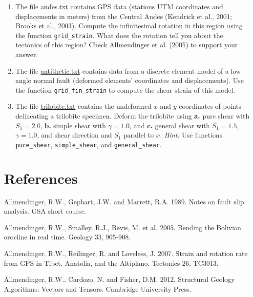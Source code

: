 \documentclass[a4paper , 12pt]{book}
\newcommand{\code}[1]{\colorbox{light-gray}{\texttt{#1}}}
\begin{document}
\begin{enumerate}
    \item The file \href{https://github.com/nfcd/compGeo/blob/master/source/data/ch8-exercise2/andes.txt}{andes.txt} contains GPS data (stations UTM coordinates and displacements in meters) from the Central Andes (Kendrick et al., 2001; Brooks et al., 2003). Compute the infinitesimal rotation in this region using the function \code{grid\_strain}. What does the rotation tell you about the tectonics of this region? Check Allmendinger et al. (2005) to support your answer.
    
    \item The file \href{https://github.com/nfcd/compGeo/blob/master/source/data/ch8-exercise3/antithetic.txt}{antithetic.txt} contains data from a discrete element model of a low angle normal fault (deformed elements' coordinates and displacements). Use the function \code{grid\_fin\_strain} to compute the shear strain of this model.
    
    \item The file \href{https://github.com/nfcd/compGeo/blob/master/source/data/ch8-exercise4/trilobite.txt}{trilobite.txt} contains the undeformed $x$ and $y$ coordinates of points delineating a trilobite specimen. Deform the trilobite using \textbf{a.}  pure shear with $S_1 = 2.0$, \textbf{b.} simple shear with $\gamma = 1.0$, and \textbf{c.} general shear with $S_1 = 1.5$, $\gamma = 1.0$, and shear direction and $S_1$ parallel to $x$. \textit{Hint:} Use functions \code{pure\_shear}, \code{simple\_shear}, and \code{general\_shear}.

\end{enumerate}

\section*{References}

Allmendinger, R.W., Gephart, J.W. and Marrett, R.A. 1989. Notes on fault slip analysis. GSA short course.

Allmendinger, R.W., Smalley, R.J., Bevis, M. et al. 2005. Bending the Bolivian orocline in real time. Geology 33, 905-908.

Allmendinger, R.W., Reilinger, R. and Loveless, J. 2007. Strain and rotation rate from GPS in Tibet, Anatolia, and the Altiplano. Tectonics 26, TC3013.

Allmendinger, R.W., Cardozo, N. and Fisher, D.M. 2012. Structural Geology Algorithms: Vectors and Tensors. Cambridge University Press.
\end{document}
